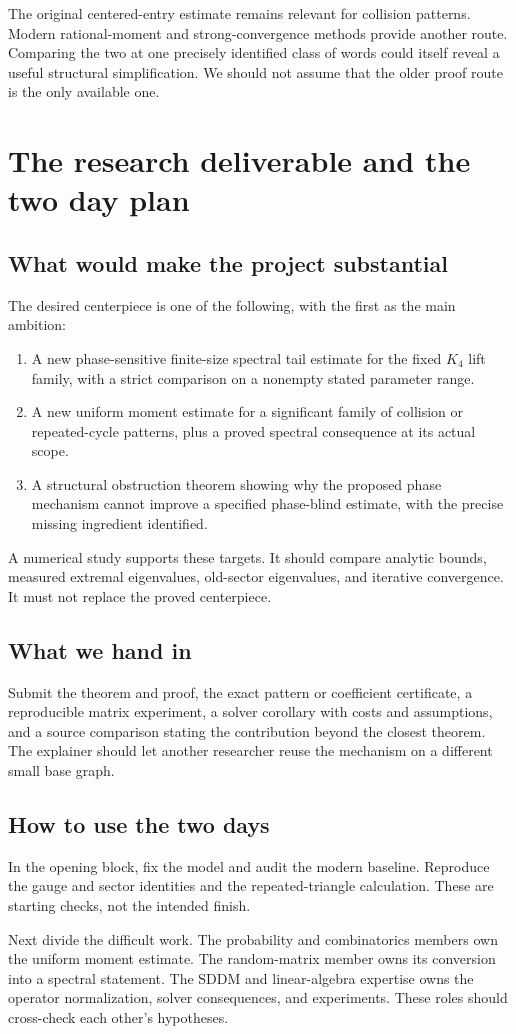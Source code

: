 \documentclass[11pt,letterpaper]{article}
\newcommand{\Page}[1]{\clearpage\section*{#1}}
\newcommand{\Sub}[1]{\subsection*{#1}}
\begin{document}
The original centered-entry estimate remains relevant for collision patterns. Modern rational-moment and strong-convergence methods provide another route. Comparing the two at one precisely identified class of words could itself reveal a useful structural simplification. We should not assume that the older proof route is the only available one.

\Page{The research deliverable and the two day plan}

\Sub{What would make the project substantial}
The desired centerpiece is one of the following, with the first as the main ambition:
\begin{enumerate}
\item A new phase-sensitive finite-size spectral tail estimate for the fixed $K_4$ lift family, with a strict comparison on a nonempty stated parameter range.
\item A new uniform moment estimate for a significant family of collision or repeated-cycle patterns, plus a proved spectral consequence at its actual scope.
\item A structural obstruction theorem showing why the proposed phase mechanism cannot improve a specified phase-blind estimate, with the precise missing ingredient identified.
\end{enumerate}
A numerical study supports these targets. It should compare analytic bounds, measured extremal eigenvalues, old-sector eigenvalues, and iterative convergence. It must not replace the proved centerpiece.

\Sub{What we hand in}
Submit the theorem and proof, the exact pattern or coefficient certificate, a reproducible matrix experiment, a solver corollary with costs and assumptions, and a source comparison stating the contribution beyond the closest theorem. The explainer should let another researcher reuse the mechanism on a different small base graph.

\Sub{How to use the two days}
In the opening block, fix the model and audit the modern baseline. Reproduce the gauge and sector identities and the repeated-triangle calculation. These are starting checks, not the intended finish.

Next divide the difficult work. The probability and combinatorics members own the uniform moment estimate. The random-matrix member owns its conversion into a spectral statement. The SDDM and linear-algebra expertise owns the operator normalization, solver consequences, and experiments. These roles should cross-check each other's hypotheses.
\end{document}
